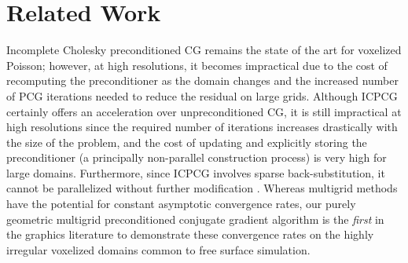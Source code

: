 \section{Related Work}

Incomplete Cholesky preconditioned CG remains the state of the art for voxelized Poisson; however, at high resolutions, it becomes impractical due to the cost of recomputing the preconditioner as the domain changes and the increased number of PCG iterations needed to reduce the residual on large grids.  
Although ICPCG certainly offers an acceleration over unpreconditioned CG, it is still impractical at high resolutions since the required number of iterations increases drastically with the size of the problem, and the cost of updating and explicitly storing the preconditioner (a principally non-parallel construction process) 
is very high for large domains.  Furthermore, since ICPCG involves sparse back-substitution, it cannot be parallelized without further modification \cite{Hughes:2007:physicalsimulation}.
Whereas multigrid methods have the potential for constant asymptotic convergence rates, our purely geometric multigrid preconditioned conjugate gradient algorithm is the \emph{first} in the graphics literature to demonstrate these convergence rates on the highly irregular voxelized domains common to free surface simulation.


